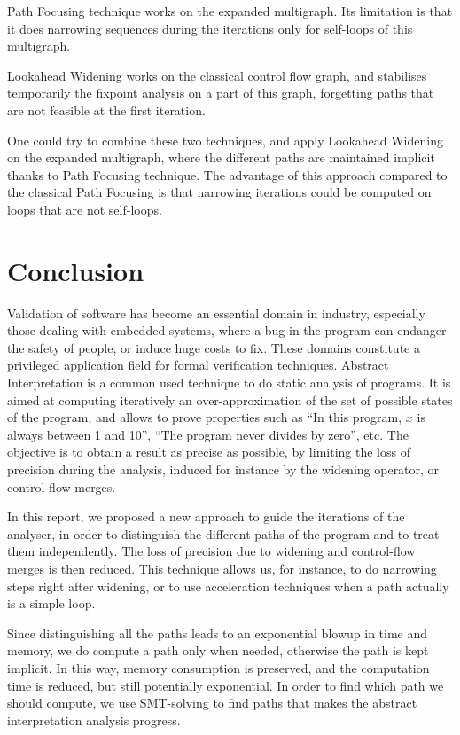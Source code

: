 \documentclass[a4paper,english,titlepage,11pt]{report}
\begin{document}
	Path Focusing technique works on the expanded multigraph.
	Its limitation is that it does narrowing
	sequences during the iterations only for self-loops of this multigraph.
	
	Lookahead Widening works on the classical control flow graph, and stabilises
	temporarily the fixpoint analysis on a part of this graph, forgetting paths
	that are not feasible at the first iteration.

	One could try to combine these two techniques, and apply Lookahead Widening
	on the expanded multigraph, where the different paths are maintained
	implicit thanks to Path Focusing technique. The advantage of this approach
	compared to the classical Path Focusing is that narrowing iterations could
	be computed on loops that are not self-loops.

\chapter{Conclusion}
  
	Validation of software has become an essential domain in industry,
	especially those dealing with embedded systems, where a bug in the program
	can endanger the safety of people, or induce huge costs to fix. These
	domains constitute a privileged application field for formal verification
	techniques.
	Abstract Interpretation is a common used technique to do static analysis of
	programs. It is aimed at computing iteratively an over-approximation of the set of
	possible states of the program, and allows to prove properties such as
	``In this program, $x$ is always between 1 and 10'', ``The program never
	divides by zero'', etc. The objective is to obtain a result as precise as
	possible, by limiting the loss of precision during the analysis, induced for
	instance by the widening operator, or control-flow merges.

	In this report, we proposed a new approach to guide the iterations of the
	analyser, in order to distinguish the different paths of the program
	and to treat them
	independently. The loss of precision due to widening and control-flow merges
	is then reduced. This technique allows us, for instance, to do narrowing
	steps right after widening, or to use acceleration techniques when a path
	actually is a simple loop.

	Since distinguishing all the paths leads to an exponential blowup in time
	and memory, we do compute a path only when needed, otherwise the path is
	kept implicit. In this way, memory consumption is preserved, and the
	computation time is reduced, but still potentially exponential.
	In order to find which path we should compute, we use SMT-solving to find
	paths that makes the abstract interpretation analysis progress.
\end{document}
